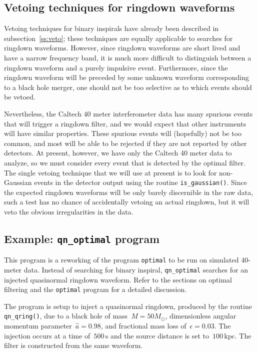 \clearpage
\subsection{Vetoing techniques for ringdown waveforms}

Vetoing techniques for binary inspirals have already been described in
subsection~\ref{ss:veto}; these techniques are equally applicable to
searches for ringdown waveforms.  However, since ringdown waveforms are
short lived and have a narrow frequency band, it is much more difficult
to distinguish between a ringdown waveform and a purely impulsive event.
Furthermore, since the ringdown waveform will be preceded by some unknown
waveform corresponding to a black hole merger, one should not be too
selective as to which events should be vetoed.

Nevertheless, the Caltech 40 meter interferometer data has many spurious
events that will trigger a ringdown filter, and we would expect that other
instruments will have similar properties.  These spurious events will
(hopefully) not be too common, and most will be able to be rejected if they
are not reported by other detectors.  At present, however, we have only
the Caltech 40 meter data to analyze, so we must consider every event that
is detected by the optimal filter.  The single vetoing technique that we will
use at present is to look for non-Gaussian events in the detector output
using the routine \texttt{is\_gaussian()}.  Since the expected ringdown
waveforms will be only barely discernible in the raw data, such a test
has no chance of accidentally vetoing an actual ringdown, but it will veto
the obvious irregularities in the data.


\clearpage
\subsection{Example: \texttt{qn\_optimal} program}

This program is a reworking of the program \texttt{optimal} to be run on
simulated 40-meter data.  Instead of searching for binary inspiral,
\texttt{qn\_optimal} searches for an injected quasinormal ringdown waveform.
Refer to the sections on optimal filtering
and the \texttt{optimal} program for a detailed discussion.

The program is setup to inject a quasinormal ringdown, produced by the
routine \texttt{qn\_qring()}, due to a black hole of mass~$M=50M_\odot$,
dimensionless angular momentum parameter~$\hat{a}=0.98$, and fractional mass
loss of~$\epsilon=0.03$.  The injection occurs at a time of~$500\,{\mathrm{s}}$
and the source distance is set to~$100\,{\mathrm{kpc}}$.  The filter is
constructed from the same waveform.

